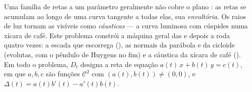 \begin{problem}\label{pb:b2:curves:1}
Uma família de retas a um parâmetro geralmente não cobre o
plano : as retas se acumulam ao longo de uma curva tangente a
todas elas, sua \emph{envoltória}. Os raios de luz
tornam as  visíveis como \emph{cáusticas} --- a curva luminosa
com cúspides numa xícara de café. Este problema constrói a
máquina geral das  e depois a roda quatro vezes: a escada
que escorrega (), as normais da parábola e da
cicloide (evolutas, com o pêndulo de Huygens no fim) e a
cáustica da xícara de café (). Em todo o problema, $D_t$ designa a
reta de equação $a(t)\,x + b(t)\,y = c(t)$, em que $a, b, c$
são funções $\mathcal C^2$ com $(a(t), b(t)) \neq (0,0)$,
e $\Delta(t) = a(t)b'(t) - a'(t)b(t)$.


\end{problem}

